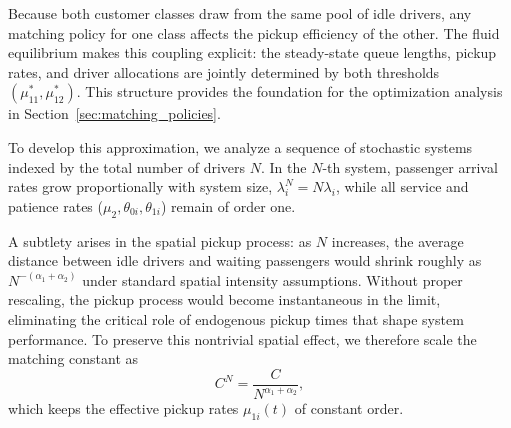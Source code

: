 Because both customer classes draw from the same pool of idle drivers, any matching policy for one class affects the pickup efficiency of the other.
The fluid equilibrium makes this coupling explicit: the steady-state queue lengths, pickup rates, and driver allocations are jointly determined by both thresholds $(\mu_{11}^*, \mu_{12}^*)$.
This structure provides the foundation for the optimization analysis in Section~\ref{sec:matching_policies}.


To develop this approximation, we analyze a sequence of stochastic systems indexed by the total number of drivers $N$.
In the $N$-th system, passenger arrival rates grow proportionally with system size, $\lambda_i^N = N\lambda_i$, while all service and patience rates ($\mu_2, \theta_{0i}, \theta_{1i}$) remain of order one.

A subtlety arises in the spatial pickup process: as $N$ increases, the average distance between idle drivers and waiting passengers would shrink roughly as $N^{-(\alpha_1+\alpha_2)}$ under standard spatial intensity assumptions.
Without proper rescaling, the pickup process would become instantaneous in the limit, eliminating the critical role of endogenous pickup times that shape system performance.
To preserve this nontrivial spatial effect, we therefore scale the matching constant as
\begin{equation*}
  C^N = \frac{C}{N^{\alpha_1+\alpha_2}},
\end{equation*}
which keeps the effective pickup rates $\mu_{1i}(t)$ of constant order. 

